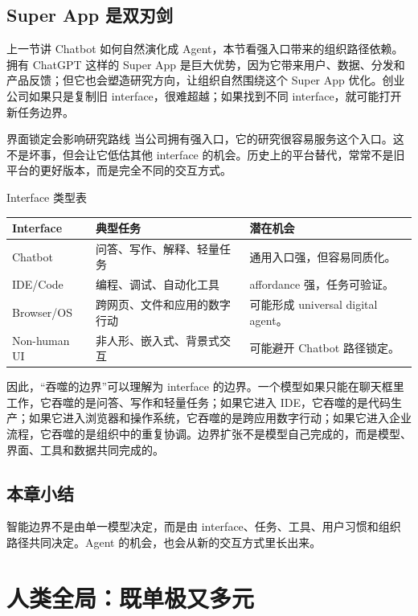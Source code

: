 \documentclass[a4paper]{article}
\begin{document}
\subsection{Super App 是双刃剑}

上一节讲 Chatbot 如何自然演化成 Agent，本节看强入口带来的组织路径依赖。拥有 ChatGPT 这样的 Super App 是巨大优势，因为它带来用户、数据、分发和产品反馈；但它也会塑造研究方向，让组织自然围绕这个 Super App 优化。创业公司如果只是复制旧 interface，很难超越；如果找到不同 interface，就可能打开新任务边界。

\begin{warningbox}{界面锁定会影响研究路线}
当公司拥有强入口，它的研究很容易服务这个入口。这不是坏事，但会让它低估其他 interface 的机会。历史上的平台替代，常常不是旧平台的更好版本，而是完全不同的交互方式。
\end{warningbox}

\begin{knowledgebox}{Interface 类型表}
\begin{tabularx}{\textwidth}{p{}p{}X}
\toprule
Interface & 典型任务 & 潜在机会 \\
\midrule
Chatbot & 问答、写作、解释、轻量任务 & 通用入口强，但容易同质化。 \\
IDE/Code & 编程、调试、自动化工具 & affordance 强，任务可验证。 \\
Browser/OS & 跨网页、文件和应用的数字行动 & 可能形成 universal digital agent。 \\
Non-human UI & 非人形、嵌入式、背景式交互 & 可能避开 Chatbot 路径锁定。 \\
\bottomrule
\end{tabularx}
\end{knowledgebox}

因此，“吞噬的边界”可以理解为 interface 的边界。一个模型如果只能在聊天框里工作，它吞噬的是问答、写作和轻量任务；如果它进入 IDE，它吞噬的是代码生产；如果它进入浏览器和操作系统，它吞噬的是跨应用数字行动；如果它进入企业流程，它吞噬的是组织中的重复协调。边界扩张不是模型自己完成的，而是模型、界面、工具和数据共同完成的。

\subsection{本章小结}

智能边界不是由单一模型决定，而是由 interface、任务、工具、用户习惯和组织路径共同决定。Agent 的机会，也会从新的交互方式里长出来。

\section{人类全局：既单极又多元}
\end{document}
